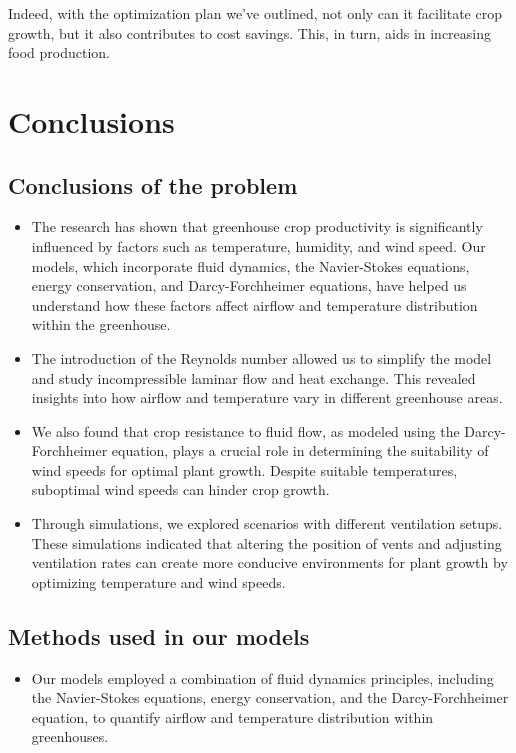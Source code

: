 \documentclass{apmcmthesis}
\begin{document}
{ 
Indeed, with the optimization plan we've outlined, not only can it facilitate crop growth, but it also contributes to cost savings. This, in turn, aids in increasing food production.


\section{Conclusions}

\subsection{Conclusions of the problem}
\begin{itemize}
\item The research has shown that greenhouse crop productivity is significantly influenced by factors such as temperature, humidity, and wind speed. Our models, which incorporate fluid dynamics, the Navier-Stokes equations, energy conservation, and Darcy-Forchheimer equations, have helped us understand how these factors affect airflow and temperature distribution within the greenhouse.

\item The introduction of the Reynolds number allowed us to simplify the model and study incompressible laminar flow and heat exchange. This revealed insights into how airflow and temperature vary in different greenhouse areas.

\item We also found that crop resistance to fluid flow, as modeled using the Darcy-Forchheimer equation, plays a crucial role in determining the suitability of wind speeds for optimal plant growth. Despite suitable temperatures, suboptimal wind speeds can hinder crop growth.

\item Through simulations, we explored scenarios with different ventilation setups. These simulations indicated that altering the position of vents and adjusting ventilation rates can create more conducive environments for plant growth by optimizing temperature and wind speeds.
\end{itemize}

\subsection{Methods used in our models}
\begin{itemize}
\item Our models employed a combination of fluid dynamics principles, including the Navier-Stokes equations, energy conservation, and the Darcy-Forchheimer equation, to quantify airflow and temperature distribution within greenhouses.


\end{itemize}}
\end{document}
